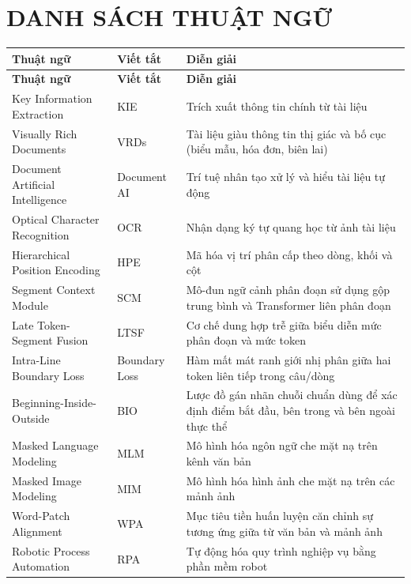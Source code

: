 \chapter*{DANH SÁCH THUẬT NGỮ}

\begingroup
\small
\renewcommand{\arraystretch}{1.25}
\begin{longtable}{|>{\RaggedRight\arraybackslash}p{4.6cm}|>{\Centering\arraybackslash}p{2.2cm}|>{\RaggedRight\arraybackslash}p{7.6cm}|}
\hline
\textbf{Thuật ngữ} & \textbf{Viết tắt} & \textbf{Diễn giải} \\ \hline
\endfirsthead
\hline
\textbf{Thuật ngữ} & \textbf{Viết tắt} & \textbf{Diễn giải} \\ \hline
\endhead
\hline
\endfoot
\hline
\endlastfoot
Key Information Extraction & KIE & Trích xuất thông tin chính từ tài liệu \\ \hline
Visually Rich Documents & VRDs & Tài liệu giàu thông tin thị giác và bố cục (biểu mẫu, hóa đơn, biên lai) \\ \hline
Document Artificial Intelligence & Document AI & Trí tuệ nhân tạo xử lý và hiểu tài liệu tự động \\ \hline
Optical Character Recognition & OCR & Nhận dạng ký tự quang học từ ảnh tài liệu \\ \hline
Hierarchical Position Encoding & HPE & Mã hóa vị trí phân cấp theo dòng, khối và cột \\ \hline
Segment Context Module & SCM & Mô-đun ngữ cảnh phân đoạn sử dụng gộp trung bình và Transformer liên phân đoạn \\ \hline
Late Token-Segment Fusion & LTSF & Cơ chế dung hợp trễ giữa biểu diễn mức phân đoạn và mức token \\ \hline
Intra-Line Boundary Loss & Boundary Loss & Hàm mất mát ranh giới nhị phân giữa hai token liên tiếp trong câu/dòng \\ \hline
Beginning-\allowbreak Inside-\allowbreak Outside & BIO & Lược đồ gán nhãn chuỗi chuẩn dùng để xác định điểm bắt đầu, bên trong và bên ngoài thực thể \\ \hline
Masked Language Modeling & MLM & Mô hình hóa ngôn ngữ che mặt nạ trên kênh văn bản \\ \hline
Masked Image Modeling & MIM & Mô hình hóa hình ảnh che mặt nạ trên các mảnh ảnh \\ \hline
Word-Patch Alignment & WPA & Mục tiêu tiền huấn luyện căn chỉnh sự tương ứng giữa từ văn bản và mảnh ảnh \\ \hline
Robotic Process Automation & RPA & Tự động hóa quy trình nghiệp vụ bằng phần mềm robot \\ \hline
\end{longtable}
\endgroup

